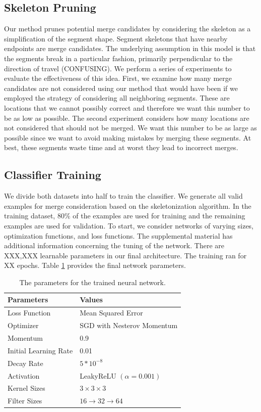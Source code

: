 \subsection{Skeleton Pruning}

Our method prunes potential merge candidates by considering the skeleton as a simplification of the segment shape. Segment skeletons that have nearby endpoints are merge candidates. The underlying assumption in this model is that the segments break in a particular fashion, primarily perpendicular to the direction of travel (CONFUSING). We perform a series of experiments to evaluate the effectiveness of this idea. First, we examine how many merge candidates are not considered using our method that would have been if we employed the strategy of considering all neighboring segments. These are locations that we cannot possibly correct and therefore we want this number to be as low as possible. The second experiment considers how many locations are not considered that should not be merged. We want this number to be as large as possible since we want to avoid making mistakes by merging these segments. At best, these segments waste time and at worst they lead to incorrect merges. 

\subsection{Classifier Training}

We divide both datasets into half to train the classifier. We generate all valid examples for merge consideration based on the skeletonization algorithm. In the training dataset, $80\%$ of the examples are used for training and the remaining examples are used for validation. To start, we consider networks of varying sizes, optimization functions, and loss functions. The supplemental material has additional information concerning the tuning of the network. There are XXX,XXX learnable parameters in our final architecture. The training ran for XX epochs. Table \ref{table:architecture} provides the final network parameters.

\begin{table}[h!]
	\centering
	\begin{tabular}{l l} \hline
		\textbf{Parameters} & \textbf{Values} \\ \hline
		Loss Function & Mean Squared Error \\
		Optimizer & SGD  with Nesterov Momentum \\
		Momentum & 0.9 \\
		Initial Learning Rate & 0.01 \\
		Decay Rate & $5 * 10^{-8}$ \\
		Activation & LeakyReLU $(\alpha = 0.001)$ \\
		Kernel Sizes & $3 \times 3 \times 3$ \\
		Filter Sizes & $16 \to 32 \to 64$ \\ \hline
	\end{tabular}
	\caption{The parameters for the trained neural network.}
	\label{table:architecture}
\end{table}

